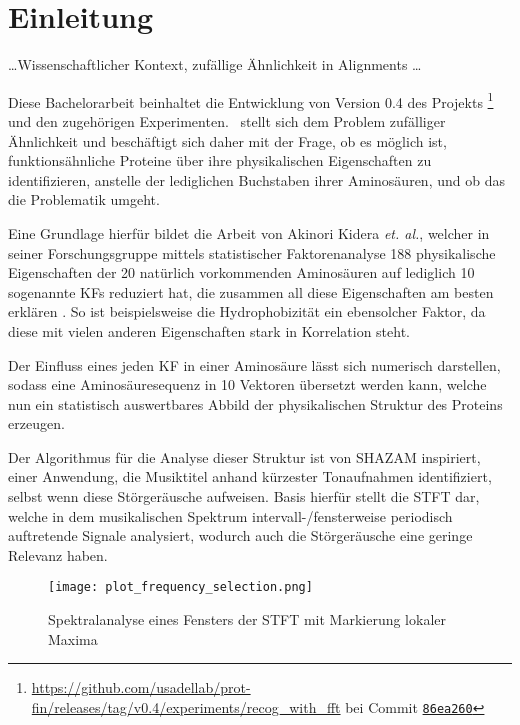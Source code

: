 \section{Einleitung} %
    \label{sec:einleitung}
    \dots Wissenschaftlicher Kontext, zufällige Ähnlichkeit in Alignments \dots

    Diese Bachelorarbeit beinhaltet die Entwicklung von Version 0.4 des Projekts \protfin\footnote{\url{https://github.com/usadellab/prot-fin/releases/tag/v0.4/experiments/recog_with_fft} bei Commit \href{https://github.com/usadellab/prot-fin/tree/86ea260b7c6d7bb520b57e2b29e350bd3942fe71/experiments/recog_with_fft}{\texttt{86ea260}}} und den zugehörigen Experimenten. \protfin\ stellt sich dem Problem zufälliger Ähnlichkeit und beschäftigt sich daher mit der Frage, ob es möglich ist, funktionsähnliche Proteine über ihre physikalischen Eigenschaften zu identifizieren, anstelle der lediglichen Buchstaben ihrer Aminosäuren, und ob das die Problematik umgeht.

    Eine Grundlage hierfür bildet die Arbeit von Akinori Kidera \textit{et. al.}, welcher in seiner Forschungsgruppe mittels statistischer Faktorenanalyse 188 physikalische Eigenschaften der 20 natürlich vorkommenden Aminosäuren auf lediglich 10 sogenannte \acp{KF} reduziert hat, die zusammen all diese Eigenschaften am besten erklären . So ist beispielsweise die Hydrophobizität ein ebensolcher Faktor, da diese mit vielen anderen Eigenschaften stark in Korrelation steht.

    Der Einfluss eines jeden \ac{KF} in einer Aminosäure lässt sich numerisch darstellen, sodass eine Aminosäuresequenz in 10 Vektoren übersetzt werden kann, welche nun ein statistisch auswertbares Abbild der physikalischen Struktur des Proteins erzeugen.

    Der Algorithmus für die Analyse dieser Struktur ist von SHAZAM inspiriert, einer Anwendung, die Musiktitel anhand kürzester Tonaufnahmen identifiziert, selbst wenn diese Störgeräusche aufweisen. Basis hierfür stellt die \ac{STFT} dar, welche in dem musikalischen Spektrum intervall-/fensterweise periodisch auftretende Signale analysiert, wodurch auch die Störgeräusche eine geringe Relevanz haben.

    \begin{wrapfigure}{r}{0.5\textwidth}
        \texttt{[image: plot\_frequency\_selection.png]}
        \caption{Spektralanalyse eines Fensters der STFT mit Markierung lokaler Maxima}
        \label{fig:freq_selection}
    \end{wrapfigure}

